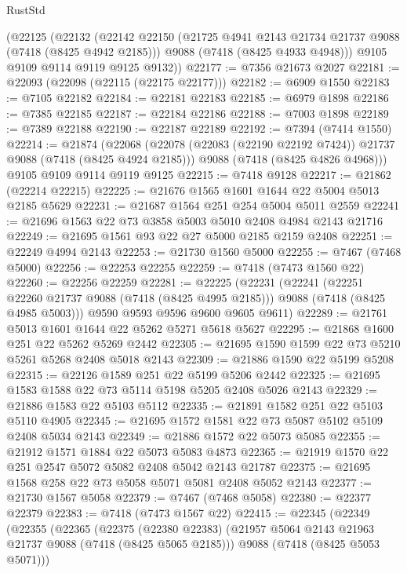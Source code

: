 \begin{lexlean}{RustStd}
\begin{coremodule}
    (@22125
      (@22132
        (@22142
          @22150
          (@21725 @4941 @2143 @21734 @21737 @9088 (@7418 (@8425 @4942 @2185)))
          @9088
          (@7418 (@8425 @4933 @4948)))
        @9105
        @9109
        @9114
        @9119
        @9125
        @9132))
@22177 := @7356 @21673 @2027
@22181 := @22093 (@22098 (@22115 (@22175 @22177)))
@22182 := @6909 @1550
@22183 := @7105 @22182
@22184 := @22181 @22183
@22185 := @6979 @1898
@22186 := @7385 @22185
@22187 := @22184 @22186
@22188 := @7003 @1898
@22189 := @7389 @22188
@22190 := @22187 @22189
@22192 := @7394 (@7414 @1550)
@22214 := @21874
    (@22068
      (@22078 (@22083 (@22190 @22192 @7424)) @21737 @9088 (@7418 (@8425 @4924 @2185)))
      @9088
      (@7418 (@8425 @4826 @4968)))
    @9105
    @9109
    @9114
    @9119
    @9125
@22215 := @7418 @9128
@22217 := @21862 (@22214 @22215)
@22225 := @21676 @1565 @1601 @1644 @22 @5004 @5013 @2185 @5629
@22231 := @21687 @1564 @251 @254 @5004 @5011 @2559
@22241 := @21696 @1563 @22 @73 @3858 @5003 @5010 @2408 @4984 @2143 @21716
@22249 := @21695 @1561 @93 @22 @27 @5000 @2185 @2159 @2408
@22251 := @22249 @4994 @2143
@22253 := @21730 @1560 @5000
@22255 := @7467 (@7468 @5000)
@22256 := @22253 @22255
@22259 := @7418 (@7473 @1560 @22)
@22260 := @22256 @22259
@22281 := @22225
    (@22231
      (@22241
        (@22251 @22260 @21737 @9088 (@7418 (@8425 @4995 @2185)))
        @9088
        (@7418 (@8425 @4985 @5003)))
      @9590
      @9593
      @9596
      @9600
      @9605
      @9611)
@22289 := @21761 @5013 @1601 @1644 @22 @5262 @5271 @5618 @5627
@22295 := @21868 @1600 @251 @22 @5262 @5269 @2442
@22305 := @21695 @1590 @1599 @22 @73 @5210 @5261 @5268 @2408 @5018 @2143
@22309 := @21886 @1590 @22 @5199 @5208
@22315 := @22126 @1589 @251 @22 @5199 @5206 @2442
@22325 := @21695 @1583 @1588 @22 @73 @5114 @5198 @5205 @2408 @5026 @2143
@22329 := @21886 @1583 @22 @5103 @5112
@22335 := @21891 @1582 @251 @22 @5103 @5110 @4905
@22345 := @21695 @1572 @1581 @22 @73 @5087 @5102 @5109 @2408 @5034 @2143
@22349 := @21886 @1572 @22 @5073 @5085
@22355 := @21912 @1571 @1884 @22 @5073 @5083 @4873
@22365 := @21919 @1570 @22 @251 @2547 @5072 @5082 @2408 @5042 @2143 @21787
@22375 := @21695 @1568 @258 @22 @73 @5058 @5071 @5081 @2408 @5052 @2143
@22377 := @21730 @1567 @5058
@22379 := @7467 (@7468 @5058)
@22380 := @22377 @22379
@22383 := @7418 (@7473 @1567 @22)
@22415 := @22345
    (@22349
      (@22355
        (@22365
          (@22375
            (@22380 @22383)
            (@21957 @5064 @2143 @21963 @21737 @9088 (@7418 (@8425 @5065 @2185)))
            @9088
            (@7418 (@8425 @5053 @5071)))

\end{coremodule}
\end{lexlean}
